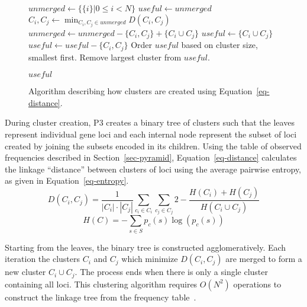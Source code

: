 \documentclass{sig-alternate}
\begin{document}
\begin{figure}
  \begin{algorithmic}
    \State $unmerged \leftarrow \{\{i\} | 0 \le i < N\}$
    \State $useful \leftarrow unmerged$
      \State $C_i, C_j \leftarrow \min_{C_i,C_j \in unmerged} D(C_i, C_j)$
      \State $unmerged \leftarrow unmerged - \{C_i, C_j\} + \{C_i \cup C_j\}$
      \State $useful \leftarrow \{C_i \cup C_j\}$
        \State $useful \leftarrow useful - \{C_i, C_j\}$
      \EndIf
    \EndWhile
    \State Order $useful$ based on cluster size, smallest first.
    \State Remove largest cluster from $useful$.

    \Return $useful$
  \EndProcedure
\end{algorithmic}
  \caption{Algorithm describing how clusters are created using Equation~\ref{eq-distance}.}
  \label{fig:cluster-creation}
\end{figure}


During cluster creation, P3 creates a binary tree of clusters such that the leaves
represent individual gene loci and each internal node represent the subset of loci created
by joining the subsets encoded in its children.
Using the table of observed frequencies described in Section~\ref{sec-pyramid}, Equation~\ref{eq-distance}
calculates the linkage ``distance'' between clusters of loci using the average pairwise
entropy, as given in Equation~\ref{eq-entropy}.
\begin{equation}
  D(C_i,C_j) = \frac{1}{\left | C_i \right |\cdot \left |C_j \right|}\sum_{c_i \in C_i}\sum_{c_j \in C_j} 
  2 - \frac{H(C_i) + H(C_j)}{H(C_i \cup C_j)}
  \label{eq-distance}
\end{equation}
\begin{equation}
  H(C) = -\sum_{s\in S} p_c(s)\log(p_c(s))
  \label{eq-entropy}
\end{equation}

Starting from the leaves, the binary tree is constructed agglomeratively. Each
iteration the clusters $C_i$ and $C_j$ which minimize $D(C_i, C_j)$ are
merged to form a new cluster $C_i \cup C_j$.
The process ends when there is only a single cluster
containing all loci.  This clustering algorithm
requires $O(N^2)$ operations to construct the linkage tree
from the frequency table~\cite{gronau:2007:upgma}.
\end{document}
